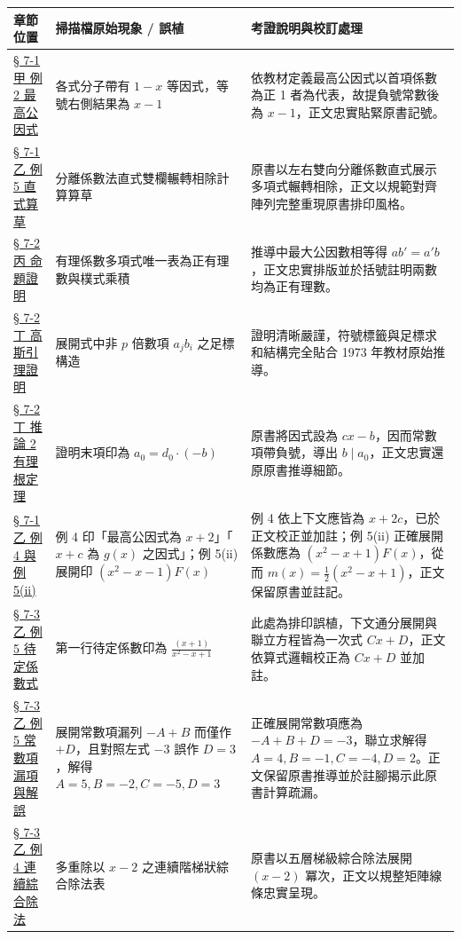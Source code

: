 \documentclass[a4paper,12pt,twoside]{article}
\begin{document}
\begin{table}[H]
\centering
\small
\renewcommand{\arraystretch}{1.35}
\begin{tabularx}{\textwidth}{|p{3.2cm}|p{3.8cm}|X|}
\hline
\textbf{章節位置} & \textbf{掃描檔原始現象 / 誤植} & \textbf{考證說明與校訂處理} \\ \hline

\hyperref[subsec:7-1-a]{§ 7-1 甲 例 2 最高公因式} & 
各式分子帶有 $1-x$ 等因式，等號右側結果為 $x-1$ & 
依教材定義最高公因式以首項係數為正 1 者為代表，故提負號常數後為 $x-1$，正文忠實貼緊原書記號。 \\ \hline

\hyperref[subsec:7-1-b]{§ 7-1 乙 例 5 直式算草} & 
分離係數法直式雙欄輾轉相除計算算草 & 
原書以左右雙向分離係數直式展示多項式輾轉相除，正文以規範對齊陣列完整重現原書排印風格。 \\ \hline

\hyperref[prop:primitive_unique]{§ 7-2 丙 命題證明} & 
有理係數多項式唯一表為正有理數與樸式乘積 & 
推導中最大公因數相等得 $ab'=a'b$，正文忠實排版並於括號註明兩數均為正有理數。 \\ \hline

\hyperref[lem:gauss]{§ 7-2 丁 高斯引理證明} & 
展開式中非 $p$ 倍數項 $a_j b_i$ 之足標構造 & 
證明清晰嚴謹，符號標籤與足標求和結構完全貼合 1973 年教材原始推導。 \\ \hline

\hyperref[cor:rational_root]{§ 7-2 丁 推論 2 有理根定理} & 
證明末項印為 $a_0 = d_0 \cdot (-b)$ & 
原書將因式設為 $cx-b$，因而常數項帶負號，導出 $b \mid a_0$，正文忠實還原原書推導細節。 \\ \hline

\hyperref[ex:7-1-6]{§ 7-1 乙 例 4 與例 5(ii)} & 
例 4 印「最高公因式為 $x+2$」「$x+c$ 為 $g(x)$ 之因式」；例 5(ii) 展開印 $(x^2-x-1)F(x)$ & 
例 4 依上下文應皆為 $x+2c$，已於正文校正並加註；例 5(ii) 正確展開係數應為 $(x^2-x+1)F(x)$，從而 $m(x)=\frac{1}{2}(x^2-x+1)$，正文保留原書並註記。 \\ \hline

\hyperref[note:ch7-cx-plus-d]{§ 7-3 乙 例 5 待定係數式} & 
第一行待定係數印為 $\frac{(x+1)}{x^2-x+1}$ & 
此處為排印誤植，下文通分展開與聯立方程皆為一次式 $Cx+D$，正文依算式邏輯校正為 $Cx+D$ 並加註。 \\ \hline

\hyperref[note:ch7-const-term]{§ 7-3 乙 例 5 常數項漏項與解誤} & 
展開常數項漏列 $-A+B$ 而僅作 $+D$，且對照左式 $-3$ 誤作 $D=3$，解得 $A=5, B=-2, C=-5, D=3$ & 
正確展開常數項應為 $-A+B+D=-3$，聯立求解得 $A=4, B=-1, C=-4, D=2$。正文保留原書推導並於註腳揭示此原書計算疏漏。 \\ \hline

\hyperref[subsec:7-3-b]{§ 7-3 乙 例 4 連續綜合除法} & 
多重除以 $x-2$ 之連續階梯狀綜合除法表 & 
原書以五層梯級綜合除法展開 $(x-2)$ 冪次，正文以規整矩陣線條忠實呈現。 \\ \hline

\end{tabularx}
\end{table}

\clearpage
\tableofcontents
\newpage


\end{document}
